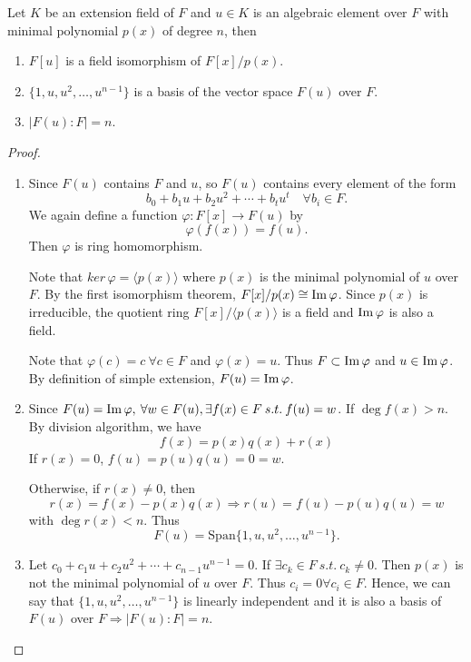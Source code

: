 \begin{theorem}
    Let $K$ be an extension field of $F$ and $u \in K$ is an algebraic element 
    over $F$ with minimal polynomial $p(x)$ of degree $n$, then 
    \begin{enumerate}
        \item $F[u]$ is a field isomorphism of $F[x]/p(x)$.
        \item $\{ 1, u, u^2, \ldots, u^{n-1}\}$ is a basis of the 
            vector space $F(u)$ over $F$.
        \item $|F(u):F|=n$.
    \end{enumerate}
\end{theorem}
\begin{proof}
    \begin{enumerate}
        \item Since $F(u)$ contains $F$ and $u$, so $F(u)$ contains every element of the form 
        \[
            b_0 + b_1u + b_2u^2 + \cdots + b_tu^t \quad \forall b_i \in F.
        \]
        We again define a function $\varphi : F[x] \to F(u)$ by 
        \[
            \varphi(f(x)) = f(u).
        \]
        Then $\varphi$ is ring homomorphism.

        Note that $ker\, \varphi = \langle p(x) \rangle$ where $p(x)$ is the minimal polynomial 
        of $u$ over $F$. By the first isomorphism theorem, $F[x] / p(x) \cong \operatorname{Im} \varphi$.
        Since $p(x)$ is irreducible, the quotient ring $F[x] / \langle p(x) \rangle$ is a field and 
        $\operatorname{Im} \varphi$ is also a field.

        Note that $\varphi(c) = c \> \forall c \in F$ and $\varphi (x) = u$. Thus $F \subset \operatorname{Im} \varphi$ and 
        $u \in \operatorname{Im} \varphi$. By definition of simple extension, $F(u) = \operatorname{Im} \varphi$.

        \item Since $F(u) = \operatorname{Im} \varphi, \> \forall w \in F(u), \exists f(x) \in F \> s.t. \>
        f(u) = w$. If $\deg f(x) > n$. By division algorithm, we have 
        \[
            f(x) = p(x) q(x) + r(x)
        \]
        If $r(x) = 0$, $f(u) = p(u)q(u) = 0 = w$.

        Otherwise, if $r(x) \neq 0$, then 
        \[
            r(x) = f(x) - p(x)q(x) \Longrightarrow r(u) = f(u) - p(u)q(u) = w
        \]
        with $\deg r(x) < n$. Thus 
        \[
            F(u) = \text{Span}\{1 , u, u^2, \ldots, u^{n-1} \}.
        \]
        
        \item Let $c_0 +c_1u + c_2u^2 + \cdots + c_{n-1}u^{n-1} = 0$. If 
        $\exists c_k \in F \> s.t. \> c_k \neq 0$. Then $p(x)$ is not the minimal polynomial of 
        $u$ over $F$. Thus $c_i = 0 \forall c_i \in F$. Hence, we can say that 
        $\{1, u, u^2, \ldots, u^{n-1} \}$ is linearly independent and it is also 
        a basis of $F(u)$ over $F \Longrightarrow |F(u):F| = n$.
    \end{enumerate}
\end{proof}

